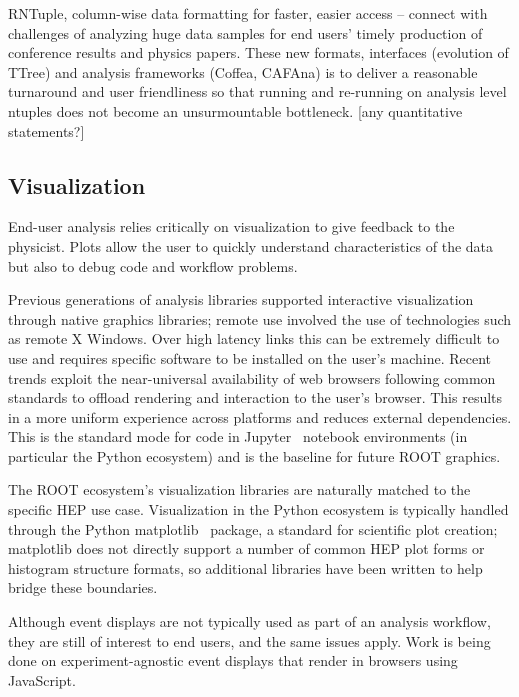 RNTuple, column-wise data formatting for faster, easier access -- connect with challenges of analyzing huge data samples for end users' timely production of conference results and physics papers. These new formats, interfaces (evolution of TTree) and analysis frameworks (Coffea, CAFAna) is to deliver a reasonable turnaround and user friendliness so that running and re-running on analysis level ntuples does not become an unsurmountable bottleneck. [any quantitative statements?]

\subsection{Visualization}

End-user analysis relies critically on visualization to give feedback to the physicist. Plots allow the user to quickly understand characteristics of the data but also to debug code and workflow problems.

Previous generations of analysis libraries supported interactive visualization through native graphics libraries; remote use involved the use of technologies such as remote X Windows. Over high latency links this can be extremely difficult to use and requires specific software to be installed on the user's machine. Recent trends exploit the near-universal availability of web browsers following common standards to offload rendering and interaction to the user's browser. This results in a more uniform experience across platforms and reduces external dependencies. This is the standard mode for code in Jupyter~\cite{soton403913} notebook environments (in particular the Python ecosystem) and is the baseline for future ROOT graphics.

The ROOT ecosystem's visualization libraries are naturally matched to the specific HEP use case. Visualization in the Python ecosystem is typically handled through the Python matplotlib~\cite{Hunter:2007} package, a standard for scientific plot creation; matplotlib does not directly support a number of common HEP plot forms or histogram structure formats, so additional libraries have been written to help bridge these boundaries.

Although event displays are not typically used as part of an analysis workflow, they are still of interest to end users, and the same issues apply. Work is being done on experiment-agnostic event displays that render in browsers using JavaScript.

